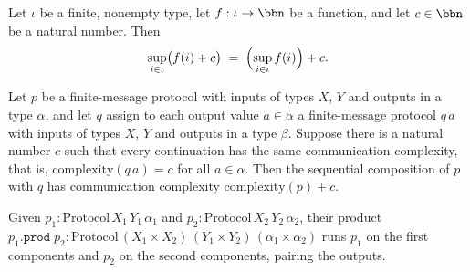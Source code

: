 \begin{theorem}
\label{CommunicationComplexity.Deterministic.FiniteMessage.Protocol.finset_sup_add_const}
\leanok
{}
Let $\iota$ be a finite, nonempty type, let $f : \iota \to \bbn$ be a function, and let
$c \in \bbn$ be a natural number. Then
\[
  \sup_{i \in \iota} \bigl(f(i) + c\bigr) \;=\; \Bigl(\sup_{i \in \iota} f(i)\Bigr) + c.
\]
\end{theorem}

\begin{theorem}
\label{CommunicationComplexity.Deterministic.FiniteMessage.Protocol.bind_complexity_const}
\leanok
{}
Let $p$ be a finite-message protocol with inputs of types $X$, $Y$ and outputs in a type
$\alpha$, and let $q$ assign to each output value $a \in \alpha$ a finite-message
protocol $q\,a$ with inputs of types $X$, $Y$ and outputs in a type $\beta$. Suppose
there is a natural number $c$ such that every continuation has the same communication
complexity, that is, $\mathrm{complexity}(q\,a) = c$ for all $a \in \alpha$. Then the
sequential composition of $p$ with $q$ has communication complexity
$\mathrm{complexity}(p) + c$.
\end{theorem}

\begin{definition}
\label{CommunicationComplexity.Deterministic.FiniteMessage.Protocol.prod}
\leanok
{}
Given $p_1 : \mathrm{Protocol}\,X_1\,Y_1\,\alpha_1$ and
$p_2 : \mathrm{Protocol}\,X_2\,Y_2\,\alpha_2$, their product
$p_1.\texttt{prod}\;p_2 : \mathrm{Protocol}\,(X_1 \times X_2)\,(Y_1 \times Y_2)\,(\alpha_1 \times \alpha_2)$
runs $p_1$ on the first components and $p_2$ on the second components, pairing the outputs.
\end{definition}

